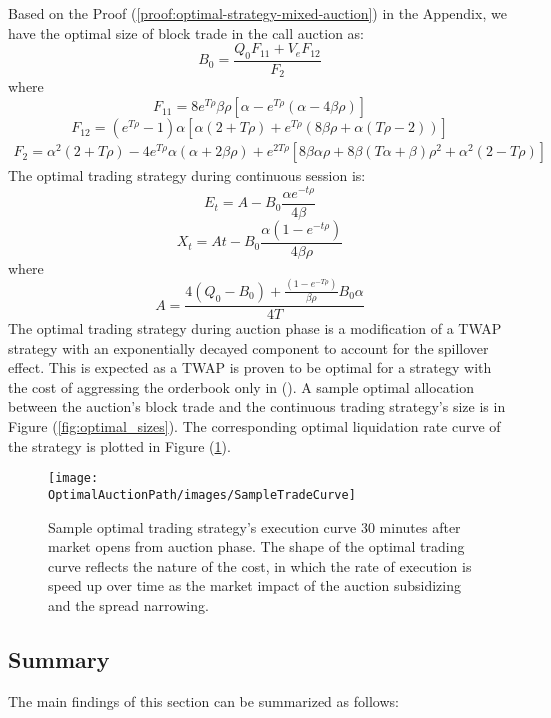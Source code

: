 Based on the Proof (\ref{proof:optimal-strategy-mixed-auction}) in the Appendix, we have the optimal size of block trade in the call auction as:
\[
  B_0 = \frac{Q_0 F_{11} + V_e F_{12}}{F_2}
\]
where
\[
  F_{11} = 8 e^{T \rho} \beta \rho [\alpha - e^{T \rho} (\alpha - 4 \beta \rho)]
\]
\[
  F_{12} = (e^{T \rho}-1) \alpha [\alpha (2+T \rho) + e^{T \rho} (8 \beta \rho + \alpha (T \rho - 2 ))]
\]
\[
  \begin{split}
    F_2 = \alpha^2 (2 + T \rho) - 4 e^{T \rho} \alpha (\alpha + 2 \beta \rho)
    + e^{2 T \rho} [8 \beta \alpha \rho + 8 \beta (T \alpha + \beta) \rho^2 + \alpha^2 (2 - T \rho)]
  \end{split}
\]
The optimal trading strategy during continuous session is:
\[
  E_t = A - B_0 \frac{\alpha e^{-t \rho}}{4 \beta}
\]
\[
  X_t = A t - B_0 \frac{\alpha (1- e^{-t \rho})}{4 \beta \rho}
\]
where
\[
  A =   \frac{4 (Q_0 - B_0) + \frac{(1 - e^{-T \rho})}{\beta \rho} B_0 \alpha} {4 T}
\]
The optimal trading strategy during auction phase is a modification of a TWAP strategy with an exponentially decayed component to account for the spillover effect. This is expected as a TWAP is proven to be optimal for a strategy with the cost of aggressing the orderbook only in (\cite{Ho1981}). A sample optimal allocation between the auction's block trade and the continuous trading strategy's size is in Figure (\ref{fig:optimal_sizes}). The corresponding optimal liquidation rate curve of the strategy is plotted in Figure (\ref{fig:optimal_curve_strategy}).



\begin{figure}[h]
  \texttt{[image: \\OptimalAuctionPath/images/SampleTradeCurve]}
  \caption{Sample optimal trading strategy's execution curve 30 minutes after market opens from auction phase. The shape of the optimal trading curve reflects the nature of the cost, in which the rate of execution is speed up over time as the market impact of the auction subsidizing and the spread narrowing.}
  \label{fig:optimal_curve_strategy}
\end{figure}

\subsection{Summary}

The main findings of this section can be summarized as follows:

